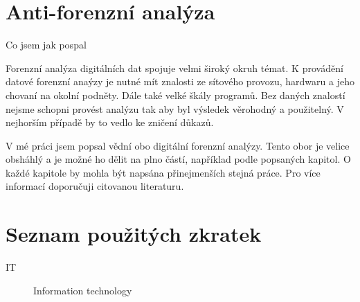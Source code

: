 \documentclass[thesis=B,czech]{FITthesis}[2012/06/26]
\begin{document}
\chapter{Anti-forenzní analýza}






  
\begin{conclusion}
Co jsem jak pospal

Forenzní analýza digitálních dat spojuje velmi široký okruh témat. K provádění datové forenzní anaýzy je nutné mít znalosti ze sítového provozu, hardwaru a jeho chovaní na okolní podněty. Dále také velké škály programů. Bez daných znalostí nejsme schopni provést analýzu tak aby byl výsledek věrohodný a použitelný. V nejhorším případě by to vedlo ke zničení důkazů. 

V mé práci jsem popsal vědní obo digitální forenzní analýzy. Tento obor je velice obsháhlý a je možné ho dělit na plno částí, například podle popsaných kapitol. O každé kapitole by mohla být napsána přinejmenších stejná práce. Pro více informací doporučuji citovanou literaturu.






\end{conclusion}




\appendix

\chapter{Seznam použitých zkratek}
\begin{description}

    \item[IT] Information technology


\end{description}
\end{document}
